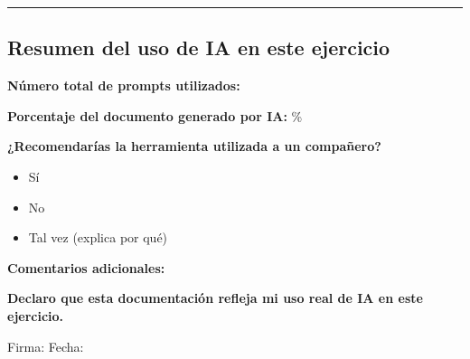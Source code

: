 \vspace{0.5cm}
\rule{\textwidth}{0.5pt}
\vspace{0.5cm}

\subsection*{Resumen del uso de IA en este ejercicio}

\textbf{Número total de prompts utilizados:} \underline{\hspace{1cm}}

\textbf{Porcentaje del documento generado por IA:} \underline{\hspace{1cm}} \%

\textbf{¿Recomendarías la herramienta utilizada a un compañero?}
\begin{itemize}
    \item[ ] Sí
    \item[ ] No
    \item[ ] Tal vez (explica por qué)
\end{itemize}

\textbf{Comentarios adicionales:}
\vspace{0.3cm}
\underline{\hspace{12cm}}
\vspace{0.2cm}
\underline{\hspace{12cm}}
\vspace{0.2cm}
\underline{\hspace{12cm}}

\vspace{0.5cm}

\begin{center}
    \textbf{Declaro que esta documentación refleja mi uso real de IA en este ejercicio.}
    \vspace{0.3cm}
    
    Firma: \underline{\hspace{5cm}} \quad Fecha: \underline{\hspace{3cm}}
\end{center}


